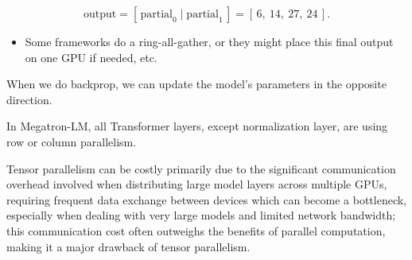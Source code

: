 \[
\text{output} = [\, \text{partial}_0 \;\big|\; \text{partial}_1\,] = [\,6,\ 14,\ 27,\ 24\,].
\]
\begin{itemize}
	\item Some frameworks do a ring-all-gather, or they might place this final output on one GPU if needed, etc. 
\end{itemize}

When we do backprop, we can update the model's parameters in the opposite direction. 


In Megatron-LM, all Transformer layers, except normalization layer, are using row or column parallelism. 


Tensor parallelism can be costly primarily due to the significant communication overhead involved when distributing large model layers across multiple GPUs, requiring frequent data exchange between devices which can become a bottleneck, especially when dealing with very large models and limited network bandwidth; this communication cost often outweighs the benefits of parallel computation, making it a major drawback of tensor parallelism. 
